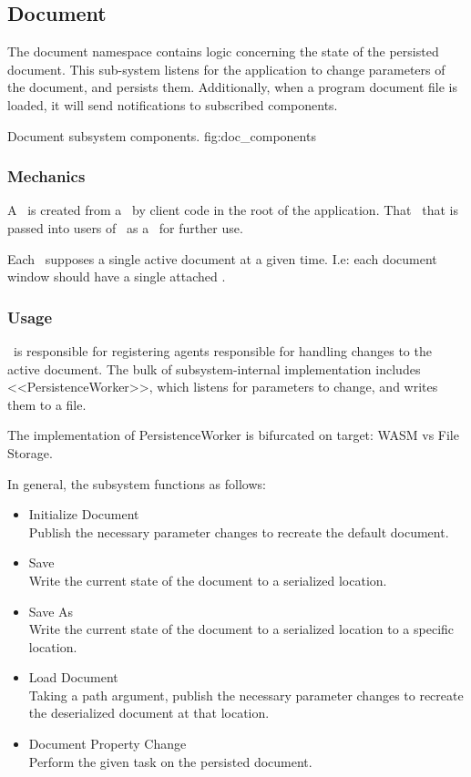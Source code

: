 \newcommand{\docarea}[3]{
      \index{#1}\pbodyitem{#2}{#3}
}

\newcommand{\extparamref}[3]{
      \index{#1}\pbodyitem{#2}{#3}
}

\subsection{Document}
The document namespace contains logic concerning the state of the persisted document.
This sub-system listens for the application to change parameters of the document, and persists them.
Additionally, when a program document file is loaded, it will send notifications to subscribed components.

{Document subsystem components.}
{fig:doc_components}

\subsubsection{Mechanics}
A \docsftype\ is created from a \docsfftype\ by client code in the root of the application.
That \docsftype\ that is passed into users of \docmod\ as a \docftype\ for further use.

Each \docftype\ supposes a single active document at a given time.
I.e: each document window should have a single attached \docftype.

\subsubsection{Usage}
\docftype\ is responsible for registering agents responsible for handling changes to the active document.
The bulk of subsystem-internal implementation includes <<PersistenceWorker>>, which listens for parameters to change, and writes them to a file.

The implementation of PersistenceWorker is bifurcated on target: WASM vs File Storage.

In general, the subsystem functions as follows:
\begin{itemize}
      \item Initialize Document \\
            Publish the necessary parameter changes to recreate the default document.
      \item Save \\
            Write the current state of the document to a serialized location.
      \item Save As \\
            Write the current state of the document to a serialized location to a specific location.
      \item Load Document \\
            Taking a path argument, publish the necessary parameter changes to recreate the deserialized document at that location.
      \item Document Property Change \\
            Perform the given task on the persisted document.
\end{itemize}

